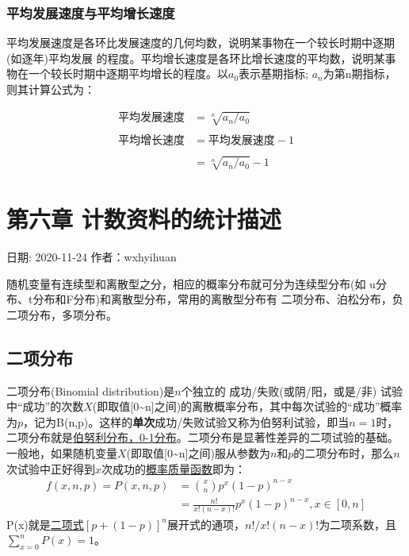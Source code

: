 \documentclass[
]{article}
\begin{document}
\hypertarget{ux5e73ux5747ux53d1ux5c55ux901fux5ea6ux4e0eux5e73ux5747ux589eux957fux901fux5ea6}{%
\subsubsection{平均发展速度与平均增长速度}\label{ux5e73ux5747ux53d1ux5c55ux901fux5ea6ux4e0eux5e73ux5747ux589eux957fux901fux5ea6}}

平均发展速度是各环比发展速度的几何均数，说明某事物在一个较长时期中逐期(如逐年)平均发展 的程度。平均增长速度是各环比增长速度的平均数，说明某事物在一个较长时期中逐期平均增长的程度。以\(a_0\)表示基期指标; \(a_n\)为第n期指标，则其计算公式为：

\[\begin{aligned}
平均发展速度 & = \sqrt[n]{a_n/a_0}\\ \\
平均增长速度 & =  平均发展速度 - 1 \\ \\
& = \sqrt[n]{a_n/a_0} -1
\end{aligned}\]

\hypertarget{ux7b2cux516dux7ae0-ux8ba1ux6570ux8d44ux6599ux7684ux7edfux8ba1ux63cfux8ff0}{%
\section{第六章 计数资料的统计描述}\label{ux7b2cux516dux7ae0-ux8ba1ux6570ux8d44ux6599ux7684ux7edfux8ba1ux63cfux8ff0}}

日期: 2020-11-24
作者：wxhyihuan

随机变量有连续型和离散型之分，相应的概率分布就可分为连续型分布(如 u分布、t分布和F分布)和离散型分布，常用的离散型分布有 二项分布、泊松分布，负二项分布，多项分布。

\hypertarget{ux4e8cux9879ux5206ux5e03}{%
\subsection{二项分布}\label{ux4e8cux9879ux5206ux5e03}}

二项分布(Binomial distribution)是\(n\)个独立的 成功/失败(或阴/阳，或是/非) 试验中``成功''的次数\(X\)(即取值{[}0\textasciitilde n{]}之间)的离散概率分布，其中每次试验的``成功''概率为\(p\)，记为B(n,p)。这样的\textbf{单次}成功/失败试验又称为伯努利试验，即当\(n = 1\)时，二项分布就是\href{https://zh.wikipedia.org/wiki/\%E4\%BC\%AF\%E5\%8A\%AA\%E5\%88\%A9\%E5\%88\%86\%E5\%B8\%83}{伯努利分布，0-1分布}。二项分布是显著性差异的二项试验的基础。一般地，如果随机变量\(X\)(即取值{[}0\textasciitilde n{]}之间)服从参数为\(n\)和\(p\)的二项分布时，那么\(n\)次试验中正好得到\(x\)次成功的\href{https://zh.wikipedia.org/wiki/\%E6\%A6\%82\%E7\%8E\%87\%E8\%B4\%A8\%E9\%87\%8F\%E5\%87\%BD\%E6\%95\%B0}{概率质量函数}即为：
\[\begin{aligned}
 f(x,n,p)=P(x,n,p) & = \binom{x}{n}p^x(1-p)^{n-x} \\
 & = \frac{n!}{x!(n-x)!}p^x(1-p)^{n-x}, x\in[0,n]
 \end{aligned}\]
P(x)就是\href{https://zh.wikipedia.org/wiki/\%E4\%BA\%8C\%E9\%A1\%B9\%E5\%BC\%8F\%E5\%AE\%9A\%E7\%90\%86}{二项式}\([p+(1-p)]^n\)展开式的通项，\(n!/x!(n-x)!\)为二项系数，且\(\sum_{x=0}^nP(x)=1\)。
\end{document}
